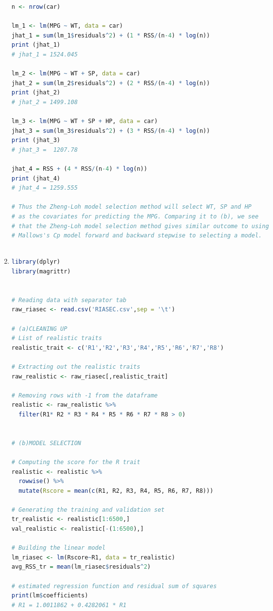 \documentclass[a4paper,10pt]{article}
\theoremstyle{definition}
\begin{document}
\begin{enumerate}
\begin{lstlisting}[language=R,commentstyle=\fontseries{lc}\color{gray}]
n <- nrow(car)

lm_1 <- lm(MPG ~ WT, data = car)
jhat_1 = sum(lm_1$residuals^2) + (1 * RSS/(n-4) * log(n))
print (jhat_1)
# jhat_1 = 1524.045

lm_2 <- lm(MPG ~ WT + SP, data = car)
jhat_2 = sum(lm_2$residuals^2) + (2 * RSS/(n-4) * log(n))
print (jhat_2)
# jhat_2 = 1499.108

lm_3 <- lm(MPG ~ WT + SP + HP, data = car)
jhat_3 = sum(lm_3$residuals^2) + (3 * RSS/(n-4) * log(n)) 
print (jhat_3)
# jhat_3 =  1207.78

jhat_4 = RSS + (4 * RSS/(n-4) * log(n)) 
print (jhat_4)
# jhat_4 = 1259.555

# Thus the Zheng-Loh model selection method will select WT, SP and HP 
# as the covariates for predicting the MPG. Comparing it to (b), we see
# that the Zheng-Loh model selection method gives similar outcome to using
# Mallows's Cp model forward and backward stepwise to selecting a model.



\end{lstlisting}
\newpage

\item
\begin{lstlisting}[language=R,commentstyle=\fontseries{lc}\color{gray}]
library(dplyr)
library(magrittr)


# Reading data with separator tab
raw_riasec <- read.csv('RIASEC.csv',sep = '\t')

# (a)CLEANING UP
# List of realistic traits
realistic_trait <- c('R1','R2','R3','R4','R5','R6','R7','R8')

# Extracting out the realistic traits
raw_realistic <- raw_riasec[,realistic_trait]

# Removing rows with -1 from the dataframe
realistic <- raw_realistic %>%
  filter(R1* R2 * R3 * R4 * R5 * R6 * R7 * R8 > 0)
  

# (b)MODEL SELECTION

# Computing the score for the R trait
realistic <- realistic %>%
  rowwise() %>%
  mutate(Rscore = mean(c(R1, R2, R3, R4, R5, R6, R7, R8))) 

# Generating the training and validation set 
tr_realistic <- realistic[1:6500,]
val_realistic <- realistic[-(1:6500),]

# Building the linear model
lm_riasec <- lm(Rscore~R1, data = tr_realistic)
avg_RSS_tr = mean(lm_riasec$residuals^2)

# estimated regression function and residual sum of squares
print(lm$coefficients)
# R1 = 1.0011862 + 0.4282061 * R1



\end{lstlisting}
\end{enumerate}
\end{document}
